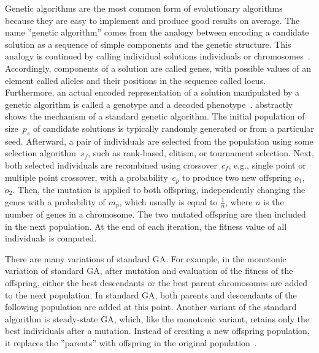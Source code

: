 \documentclass[paper=a4,%
  twoside,%
  BCOR4mm,%
  abstract=true,%
  toc=bibliography,%
  chapterprefix=true,%
  toc=bibliographynumbered,%
  open=right,%
  english,%
  pagesize=pdftex]{scrreprt}
\begin{document}
Genetic algorithms are the most common form of evolutionary algorithms because they are easy to implement and produce good results on average. The name ''genetic algorithm'' comes from the analogy between encoding a candidate solution as a sequence of simple components and the genetic structure. This analogy is continued by calling individual solutions individuals or chromosomes~\cite{Campos2017}. Accordingly, components of a solution are called genes, with possible values of an element called alleles and their positions in the sequence called locus. Furthermore, an actual encoded representation of a solution manipulated by a genetic algorithm is called a genotype and a decoded phenotype~\cite{McMinn_2004}.  abstractly shows the mechanism of a standard genetic algorithm. The initial population of size~$p_s$ of candidate solutions is typically randomly generated or from a particular seed. Afterward, a pair of individuals are selected from the population using some selection algorithm~$s_f$, such as rank-based, elitism, or tournament selection. Next, both selected individuals are recombined using crossover~$c_f$, e.g., single point or multiple point crossover, with a probability~$c_p$ to produce two new offspring $o_1$, $o_2$. Then, the mutation is applied to both offspring, independently changing the genes with a probability of $m_p$, which usually is equal to $\frac{1}{n}$, where $n$ is the number of genes in a chromosome. The two mutated offspring are then included in the next population. At the end of each iteration, the fitness value of all individuals is computed.  

There are many variations of standard \ac{GA}. For example, in the monotonic variation of standard \ac{GA}, after mutation and evaluation of the fitness of the offspring, either the best descendants or the best parent chromosomes are added to the next population. In standard \ac{GA}, both parents and descendants of the following population are added at this point. Another variant of the standard algorithm is steady-state \ac{GA}, which, like the monotonic variant, retains only the best individuals after a mutation. Instead of creating a new offspring population, it replaces the ''parents'' with offspring in the original population~\cite{Campos2017}.
\end{document}
